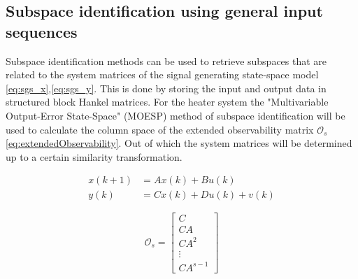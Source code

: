 \subsection{Subspace identification using general input sequences}
Subspace identification methods can be used to retrieve subspaces that are related to the system matrices of the signal generating state-space model \ref{eq:sgs_x},\ref{eq:sgs_y}. This is done by storing the input and output data in structured block Hankel matrices. For the heater system the "Multivariable Output-Error State-Space" (MOESP) method \cite[p.~301--312]{FilteringIdentification} of subspace identification will be used to calculate the column space of the extended observability matrix $\mathcal{O}_s$ \ref{eq:extendedObservability}. Out of which the system matrices will be determined up to a certain similarity transformation. 

\begin{align}
    x(k+1) &= Ax(k) + Bu(k) \label{eq:sgs_x}\\
    y(k) &= Cx(k) + Du(k) + v(k) \label{eq:sgs_y}
\end{align}

\begin{equation}
\mathcal{O}_s = \left[\begin{array}{c}
C \\
C A \\
C A^{2} \\
\vdots \\
C A^{s-1}
\end{array}\right]
\label{eq:extendedObservability}
\end{equation}

